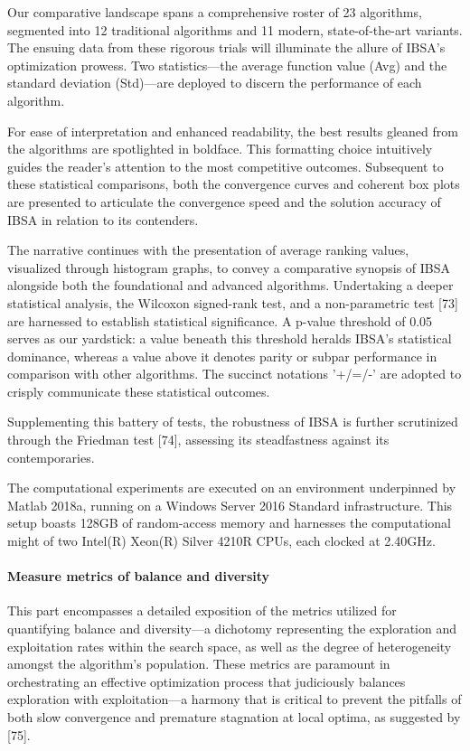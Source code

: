\documentclass{article} %
\begin{document}
Our comparative landscape spans a comprehensive roster of 23 algorithms, segmented into 12 traditional algorithms and 11 modern, state-of-the-art variants. The ensuing data from these rigorous trials will illuminate the allure of IBSA's optimization prowess. Two statistics---the average function value (Avg) and the standard deviation (Std)---are deployed to discern the performance of each algorithm.

For ease of interpretation and enhanced readability, the best results gleaned from the algorithms are spotlighted in boldface. This formatting choice intuitively guides the reader's attention to the most competitive outcomes. Subsequent to these statistical comparisons, both the convergence curves and coherent box plots are presented to articulate the convergence speed and the solution accuracy of IBSA in relation to its contenders.

The narrative continues with the presentation of average ranking values, visualized through histogram graphs, to convey a comparative synopsis of IBSA alongside both the foundational and advanced algorithms. Undertaking a deeper statistical analysis, the Wilcoxon signed-rank test, and a non-parametric test [73] are harnessed to establish statistical significance. A p-value threshold of 0.05 serves as our yardstick: a value beneath this threshold heralds IBSA's statistical dominance, whereas a value above it denotes parity or subpar performance in comparison with other algorithms. The succinct notations '+/=/-' are adopted to crisply communicate these statistical outcomes.

Supplementing this battery of tests, the robustness of IBSA is further scrutinized through the Friedman test [74], assessing its steadfastness against its contemporaries.

The computational experiments are executed on an environment underpinned by Matlab 2018a, running on a Windows Server 2016 Standard infrastructure. This setup boasts 128GB of random-access memory and harnesses the computational might of two Intel(R) Xeon(R) Silver 4210R CPUs, each clocked at 2.40GHz.


\paragraph{ Measure metrics of balance and diversity}

This part encompasses a detailed exposition of the metrics utilized for quantifying balance and diversity---a dichotomy representing the exploration and exploitation rates within the search space, as well as the degree of heterogeneity amongst the algorithm's population. These metrics are paramount in orchestrating an effective optimization process that judiciously balances exploration with exploitation---a harmony that is critical to prevent the pitfalls of both slow convergence and premature stagnation at local optima, as suggested by [75].
\end{document}

